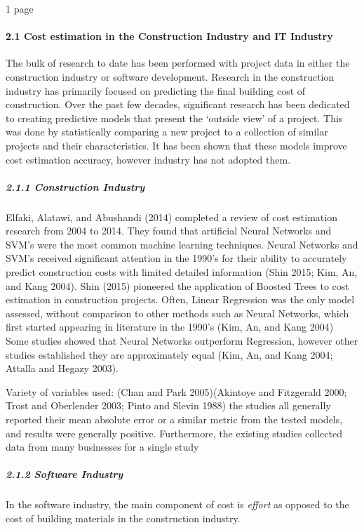 \documentclass[]{elsarticle} %
\begin{document}
1 page

\paragraph{2.1 Cost estimation in the Construction Industry and IT
Industry}\label{cost-estimation-in-the-construction-industry-and-it-industry}

The bulk of research to date has been performed with project data in
either the construction industry or software development. Research in
the construction industry has primarily focused on predicting the final
building cost of construction. Over the past few decades, significant
research has been dedicated to creating predictive models that present
the `outside view' of a project. This was done by statistically
comparing a new project to a collection of similar projects and their
characteristics. It has been shown that these models improve cost
estimation accuracy, however industry has not adopted them.

\subparagraph{2.1.1 Construction Industry}\label{construction-industry}

Elfaki, Alatawi, and Abushandi (2014) completed a review of cost
estimation research from 2004 to 2014. They found that artificial Neural
Networks and SVM's were the most common machine learning techniques.
Neural Networks and SVM's received significant attention in the 1990's
for their ability to accurately predict construction costs with limited
detailed information (Shin 2015; Kim, An, and Kang 2004). Shin (2015)
pioneered the application of Boosted Trees to cost estimation in
construction projects. Often, Linear Regression was the only model
assessed, without comparison to other methods such as Neural Networks,
which first started appearing in literature in the 1990's (Kim, An, and
Kang 2004) Some studies showed that Neural Networks outperform
Regression, however other studies established they are approximately
equal (Kim, An, and Kang 2004; Attalla and Hegazy 2003).

Variety of variables used: (Chan and Park 2005)(Akintoye and Fitzgerald
2000; Trost and Oberlender 2003; Pinto and Slevin 1988) the studies all
generally reported their mean absolute error or a similar metric from
the tested models, and results were generally positive. Furthermore, the
existing studies collected data from many businesses for a single study

\subparagraph{2.1.2 Software Industry}\label{software-industry}

In the software industry, the main component of cost is \emph{effort} as
opposed to the cost of building materials in the construction industry.
\end{document}
